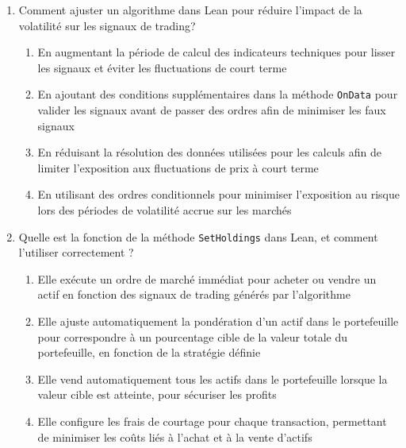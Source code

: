 \documentclass[a4paper,12pt]{article}
\begin{document}
\begin{enumerate}
    \item Comment ajuster un algorithme dans Lean pour réduire l'impact de la volatilité sur les signaux de trading?
    \begin{enumerate}[label=(\Alph*)]
        \item En augmentant la période de calcul des indicateurs techniques pour lisser les signaux et éviter les fluctuations de court terme
        \item En ajoutant des conditions supplémentaires dans la méthode \texttt{OnData} pour valider les signaux avant de passer des ordres afin de minimiser les faux signaux
        \item En réduisant la résolution des données utilisées pour les calculs afin de limiter l'exposition aux fluctuations de prix à court terme
        \item En utilisant des ordres conditionnels pour minimiser l'exposition au risque lors des périodes de volatilité accrue sur les marchés
    \end{enumerate}

    \item Quelle est la fonction de la méthode \texttt{SetHoldings} dans Lean, et comment l'utiliser correctement ?
    \begin{enumerate}[label=(\Alph*)]
        \item Elle exécute un ordre de marché immédiat pour acheter ou vendre un actif en fonction des signaux de trading générés par l'algorithme
        \item Elle ajuste automatiquement la pondération d'un actif dans le portefeuille pour correspondre à un pourcentage cible de la valeur totale du portefeuille, en fonction de la stratégie définie
        \item Elle vend automatiquement tous les actifs dans le portefeuille lorsque la valeur cible est atteinte, pour sécuriser les profits
        \item Elle configure les frais de courtage pour chaque transaction, permettant de minimiser les coûts liés à l'achat et à la vente d'actifs
    \end{enumerate}


\end{enumerate}
\end{document}
